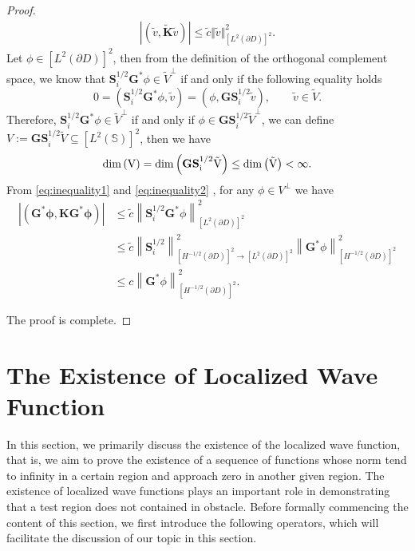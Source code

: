 \documentclass[11pt,reqno,twoside]{amsart}
\theoremstyle{definition}
\theoremstyle{remark}
\numberwithin{equation}{section}
\begin{document}
\begin{proof}
	 \begin{align}\label{eq:inequality2}
	 	\left|\left( \tilde v,\mathbf {\tilde K} \tilde v \right) \right| \leq \tilde c \Vert \tilde v\Vert^2_{\left[L^2\left(\partial D\right) \right] ^2}.
	 \end{align}
	Let $\phi \in \left[L^2\left(\partial D\right) \right] ^2$, then from the definition of the orthogonal complement space, we know that $\mathbf S^{1/2}_i \mathbf G ^* \phi \in {\tilde V}^{\perp}$ if and only if the following equality holds
	$$
	0=\left( \mathbf S^{1/2}_i \mathbf G ^* \phi,\tilde v \right)=\left( \phi, \mathbf G \mathbf S^{1/2}_i \tilde v \right) ,\qquad \tilde v \in \tilde V.
	$$
	Therefore, $\mathbf S^{1/2}_i \mathbf G ^* \phi \in {\tilde V}^{\perp}$ if and only if $\phi \in {\mathbf G \mathbf S^{1/2}_i \tilde V}^{\perp}$, we can define $V:=\mathbf G \mathbf S^{1/2}_i \tilde V \subseteq \left[L^2\left(\mathbb S\right) \right] ^2$, then we have
	$$
	\rm {dim}\left( V \right) =\rm {dim}\left( \mathbf G \mathbf S^{1/2}_i \tilde V\right) \leq \rm {dim}\left( \tilde V\right) < \infty.
	$$
	From  \eqref{eq:inequality1} and \eqref{eq:inequality2} , for any $\phi \in V^{\perp}$ we have
\begin{equation}\begin{aligned}
	\left|\left( \mathbf G ^* \mathbf {\phi} , \mathbf {KG}^* \mathbf {\phi}\right)\right| 
	&\leq \tilde c \left\|\mathbf S^{1/2}_i \mathbf G ^* \phi\right\|^2_{\left[L^2\left(\partial D\right) \right] ^2}\\
	&\leq \tilde c \left\|\mathbf S^{1/2}_i\right\|^2_{ \left[H^{-1/2}\left(\partial D\right) \right] ^2 \to \left[L^{2}\left(\partial D\right) \right] ^2} \left\|\mathbf G ^* \phi\right\|^2_{\left[H^{-1/2}\left(\partial D\right) \right] ^2}\\
	&\leq c\left\|\mathbf G ^* \phi\right\|^2_{\left[H^{-1/2}\left(\partial D\right) \right] ^2}.
	\end{aligned}\end{equation}

	The proof is complete. 
	\end{proof}
	
	
	
\section{The Existence of Localized Wave Function}\label{sec:LocalizedWaveFunction}
	In this section, we primarily discuss the existence of the localized wave function, that is, we aim to prove the existence of a sequence of functions whose norm tend to infinity in a certain region and approach zero in another given region. The existence of localized wave functions plays an important role in demonstrating that a test region does not contained in obstacle. Before formally commencing the content of this section, we first introduce the following operators, which will facilitate the discussion of our topic in this section.
	
\end{document}
